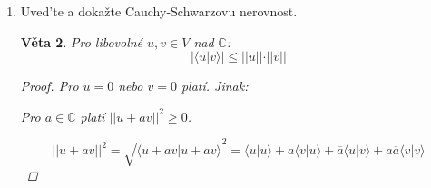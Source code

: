 \documentclass[10pt,a4paper]{article}
\theoremstyle{plain}
\newtheorem{veta}{Věta}
\begin{document}
\begin{enumerate}
\begin{veta}
\begin{proof}
Označme $A_n = A$

V tělese $\mathbb{C}$ má matice $A_n$ vlastní číslo $\lambda$ s vlastním vektorem $x$.

Zvětšíme $x$ faktorem $\frac{1}{\sqrt{x^Hx}}$, abychom dostali $x^Hx=1$.

Doplníme $x$ na unitární matici $P_n$. (To je možné dle "faktu" z přednášky).

$P^H_nA_nP_n$ je hermitovská: $(P^H_nA_nP_n)^H = P^H_nA_n^H(P_n^H)^H = P^H_nA_nP_n$.

Protože $A_nx = \lambda x$, matice $A_nP_n$ má $\lambda x$ jako první sloupec.

Protože $P_n$ je unitární, první sloupec $P^H_nA_nP_n$ je $\lambda P^Hx = \lambda(1, 0, ..., 0)^T = (\lambda, 0, ... , 0)^T$. (součin unitární matice a hermitovské transpozice je jednotková matice)

Protože je daná matice hermitovská a prvek $\lambda$ leží na diagonále, $\lambda \in \mathbb{R}$, zbytek prvního řádku je taktéž nulový.
 
 Tedy $P^H_nA_nP_n =  \begin{array}{|c|c|} \hline  \lambda & 0^T  \\ \hline  0 & A_{n-1} \\ \hline \end{array}$, kde $A_{n-1}$ je hermitovská.
 
Podle indukčního předpokladu existuje $R_{n-1}$, t.ž. $R^{-1}_{n-1}A_{n-1}R_{n-1} = D_{n-1}$.

Položme $R_n = P_n \cdot\begin{array}{|c|c|} \hline  1 & 0^T  \\ \hline  0 & R_{n-1} \\ \hline \end{array}$.

Pak $R^{-1}_nA_nR_n = D_n$
 
 
\end{proof}
\end{veta}

\item Uved'te a dokažte Cauchy-Schwarzovu nerovnost.
\begin{veta}
Pro libovolné $u, v \in V$ nad $\mathbb{C}$:
\[ |\langle u | v \rangle | \leq ||u|| \cdot ||v|| \]
\begin{proof} Pro $u = 0$ nebo $v = 0$ platí. Jinak:

Pro $a \in \mathbb{C}$ platí $||u + av||^2 \geq 0$.

\[||u + av||^2 = \sqrt{\langle u+av|u+av \rangle}^2 
= \langle u|u \rangle  + a\langle v|u \rangle + \overline{a}\langle u|v \rangle  + a \overline{a}\langle v|v \rangle \]


\end{proof}
\end{veta}
\end{enumerate}
\end{document}
